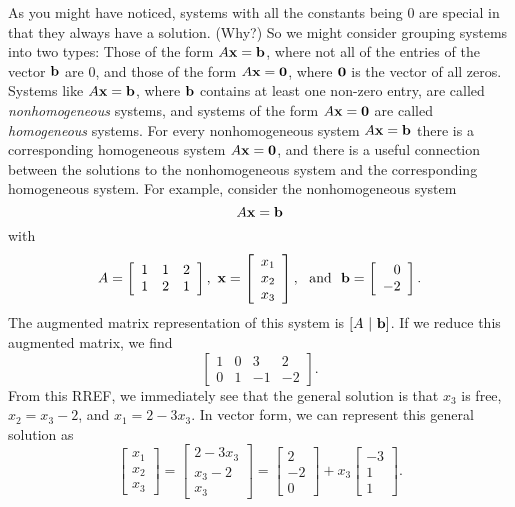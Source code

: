\begin{pa}
\item As you might have noticed, systems with all the constants being 0 are special in that they always have a solution. (Why?) So we might consider grouping systems into two types: Those of the form $A \mathbf{x} = \mathbf{b}$, where not all of the entries of the vector $\mathbf{b}$ are $0$, and those of the form $A \mathbf{x} = \mathbf{0}$, where $\mathbf{0}$ is the vector of all zeros. Systems like $A \mathbf{x} = \mathbf{b}$, where $\mathbf{b}$ contains at least one non-zero entry, are called \emph{nonhomogeneous}  systems, and systems of the form $A \mathbf{x} = \mathbf{0}$ are called \emph{homogeneous} systems. For every nonhomogeneous system $A \mathbf{x} = \mathbf{b}$ there is a corresponding homogeneous system $A \mathbf{x} = \mathbf{0}$, and there is a useful connection between the solutions to the nonhomogeneous system and the corresponding homogeneous system. For example, consider the nonhomogeneous system
\[A \mathbf{x} = \mathbf{b}\]
with 
 \begin{equation} \label{eq:PA1e_2} 
A = \left[ \begin{array}{ccc} 1 & 1 & 2  \\ 1 & 2 & 1  \end{array} \right], \ \mathbf{x} = \left[ \begin{array}{c} x_1 \\ x_2 \\ x_3 \end{array} \right], \ \text{ and } \ \mathbf{b} =  \left[ \begin{array}{r} 0 \\ -2 \end{array} \right].
\end{equation}
The augmented matrix representation of this system is $[A \ | \ \vb]$. If we reduce this augmented matrix, we find 
\[\left[ \begin{array}{ccr|r} 1 & 0 & 3 & 2 \\ 0 & 1 & -1 & -2 \end{array} \right].\]
From this RREF, we immediately see that the general solution is that $x_3$ is free, $x_2 = x_3-2$, and $x_1 = 2-3x_3$. In vector form, we can represent this general solution as
\begin{equation} \label{eq:PA1e_3}
\left[ \begin{array}{c} x_1 \\ x_2 \\ x_3 \end{array} \right] = \left[ \begin{array}{c} 2-3x_3 \\ x_3-2 \\ x_3 \end{array} \right] = \left[ \begin{array}{r} 2 \\ -2 \\ 0 \end{array} \right] + x_3\left[ \begin{array}{r} -3 \\ 1 \\ 1 \end{array} \right].

\end{equation}
\end{pa}
